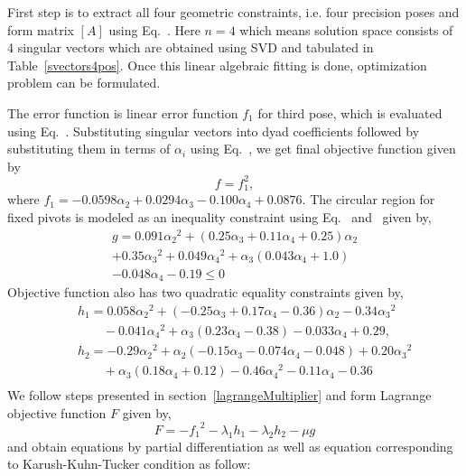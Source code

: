 First step is to extract all four geometric constraints, i.e. four precision poses and form matrix $[A]$  using Eq.~. Here $n = 4$ which means solution space consists of 4 singular vectors which are obtained using SVD and tabulated in Table~\ref{svectors4pos}. Once this linear algebraic fitting is done, optimization problem can be formulated.

The error function is linear error function $f_1$ for third pose, which is evaluated using Eq.~. Substituting singular vectors into dyad coefficients followed by substituting them in terms of $\alpha_i$ using Eq.~, we get final objective function given by
\begin{equation}
f = f_1^2,
\end{equation}
where $f_1 = -0.0598 {\alpha_2}+0.0294 {\alpha_3}-0.100 {\alpha_4}+0.0876$.
The circular region for fixed pivots is modeled as an inequality constraint using Eq.~ and~ given by,
\begin{equation}
\begin{array}{c}
g = 0.091 {\alpha_2}^2+(0.25 {\alpha_3}+0.11 {\alpha_4}+0.25) {\alpha_2}\\+0.35 {\alpha_3}^2+0.049 {\alpha_4}^2+{\alpha_3} (0.043 {\alpha_4}+1.0)\\-0.048 {\alpha_4}-0.19 \leq 0
\end{array}
\end{equation}
Objective function also has two quadratic equality constraints given by,
\begin{eqnarray}
& & h_1 = 0.058 {\alpha_2}^2+(-0.25 {\alpha_3}+0.17 {\alpha_4}-0.36) {\alpha_2} -0.34 {\alpha_3}^2  \nonumber \\
& & \ \ \ \ \ \ \ \ \  -0.041 {\alpha_4}^2+{\alpha_3} (0.23 {\alpha_4}-0.38)-0.033 {\alpha_4}+0.29, \nonumber \\
& & h_2  = -0.29 {\alpha_2}^2+{\alpha_2} (-0.15 {\alpha_3}-0.074 {\alpha_4}-0.048)+0.20 {\alpha_3}^2 \nonumber \\
& & \ \ \ \ \ \ \ \ \  +{\alpha_3} (0.18 {\alpha_4}+0.12)-0.46 {\alpha_4}^2-0.11 {\alpha_4}-0.36 \nonumber \\
\end{eqnarray}
We follow steps presented in section~\ref{lagrangeMultiplier} and form Lagrange objective function $F$ given by,
\begin{equation}
F = -{f_1}^2- \lambda_1h_1 -  \lambda_2h_2 - \mu g
\end{equation}
and obtain equations by partial differentiation as well as equation corresponding to Karush-Kuhn-Tucker condition as follow:

